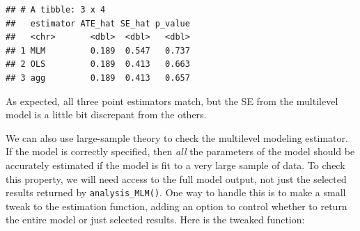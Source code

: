 \documentclass[
]{book}
\newenvironment{Shaded}{\begin{snugshade}}{\end{snugshade}}
\newcommand{\AttributeTok}[1]{\textcolor[rgb]{0.13,0.29,0.53}{#1}}
\newcommand{\ConstantTok}[1]{\textcolor[rgb]{0.56,0.35,0.01}{#1}}
\newcommand{\ControlFlowTok}[1]{\textcolor[rgb]{0.13,0.29,0.53}{\textbf{#1}}}
\newcommand{\DecValTok}[1]{\textcolor[rgb]{0.00,0.00,0.81}{#1}}
\newcommand{\FunctionTok}[1]{\textcolor[rgb]{0.13,0.29,0.53}{\textbf{#1}}}
\newcommand{\NormalTok}[1]{#1}
\newcommand{\OtherTok}[1]{\textcolor[rgb]{0.56,0.35,0.01}{#1}}
\newcommand{\SpecialCharTok}[1]{\textcolor[rgb]{0.81,0.36,0.00}{\textbf{#1}}}
\newcommand{\StringTok}[1]{\textcolor[rgb]{0.31,0.60,0.02}{#1}}
\begin{document}
\begin{verbatim}
## # A tibble: 3 x 4
##   estimator ATE_hat SE_hat p_value
##   <chr>       <dbl>  <dbl>   <dbl>
## 1 MLM         0.189  0.547   0.737
## 2 OLS         0.189  0.413   0.663
## 3 agg         0.189  0.413   0.657
\end{verbatim}

As expected, all three point estimators match, but the SE from the multilevel model is a little bit discrepant from the others.

We can also use large-sample theory to check the multilevel modeling estimator.
If the model is correctly specified, then \emph{all} the parameters of the model should be accurately estimated if the model is fit to a very large sample of data.
To check this property, we will need access to the full model output, not just the selected results returned by \texttt{analysis\_MLM()}.
One way to handle this is to make a small tweak to the estimation function, adding an option to control whether to return the entire model or just selected results.
Here is the tweaked function:

\begin{Shaded}
\end{Shaded}
\end{document}
